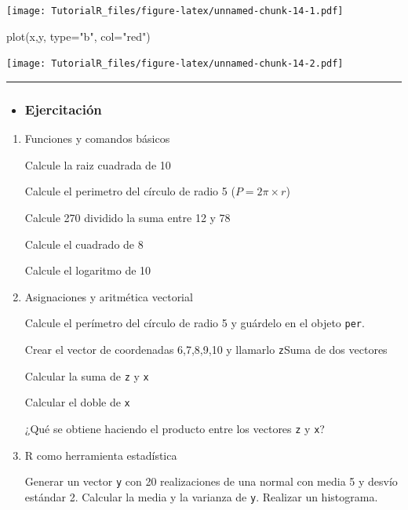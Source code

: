 \documentclass[
]{book}
\newenvironment{Shaded}{\begin{snugshade}}{\end{snugshade}}
\newcommand{\AttributeTok}[1]{\textcolor[rgb]{0.77,0.63,0.00}{#1}}
\newcommand{\FunctionTok}[1]{\textcolor[rgb]{0.00,0.00,0.00}{#1}}
\newcommand{\NormalTok}[1]{#1}
\newcommand{\StringTok}[1]{\textcolor[rgb]{0.31,0.60,0.02}{#1}}
\newenvironment{rmdblock}[1]
{\begin{shaded*}
		\begin{itemize}
			\renewcommand{\labelitemi}{
				\raisebox{-.7\height}[0pt][0pt]{
					{\setkeys{Gin}{width=3em,keepaspectratio}\texttt{[image: images/\#1]}}
				}
			}
			\item
		}
		{
		\end{itemize}
	\end{shaded*}
}
\newenvironment{rmdtip}
{\begin{rmdblock}{tip}}
	{\end{rmdblock}}
\begin{document}
\texttt{[image: TutorialR\_files/figure-latex/unnamed-chunk-14-1.pdf]}

\begin{Shaded}
\begin{Highlighting}[]
\FunctionTok{plot}\NormalTok{(x,y, }\AttributeTok{type=}\StringTok{"b"}\NormalTok{, }\AttributeTok{col=}\StringTok{"red"}\NormalTok{)}
\end{Highlighting}
\end{Shaded}

\texttt{[image: TutorialR\_files/figure-latex/unnamed-chunk-14-2.pdf]}

\begin{center}\rule{0.5\linewidth}{0.5pt}\end{center}

\begin{rmdtip}
\hypertarget{ejercitaciuxf3n}{%
\subsubsection{Ejercitación}\label{ejercitaciuxf3n}}
\end{rmdtip}

\begin{boxeda}
\begin{enumerate}
\def\labelenumi{\arabic{enumi}.}
\item
  Funciones y comandos básicos

  Calcule la raiz cuadrada de 10

  Calcule el perimetro del círculo de radio 5 (\(P = 2\pi \times r\))

  Calcule 270 dividido la suma entre 12 y 78

  Calcule el cuadrado de 8

  Calcule el logaritmo de 10
\item
  Asignaciones y aritmética vectorial

  Calcule el perímetro del círculo de radio 5 y guárdelo en el objeto
  \texttt{per}.

  Crear el vector de coordenadas 6,7,8,9,10 y llamarlo \texttt{z}Suma de
  dos vectores

  Calcular la suma de \texttt{z} y \texttt{x}

  Calcular el doble de \texttt{x}

  ¿Qué se obtiene haciendo el producto entre los vectores \texttt{z} y
  \texttt{x}?
\item
  R como herramienta estadística

  Generar un vector \texttt{y} con 20 realizaciones de una normal con
  media 5 y desvío estándar 2. Calcular la media y la varianza de
  \texttt{y}. Realizar un histograma.
\end{enumerate}
\end{boxeda}
\end{document}
